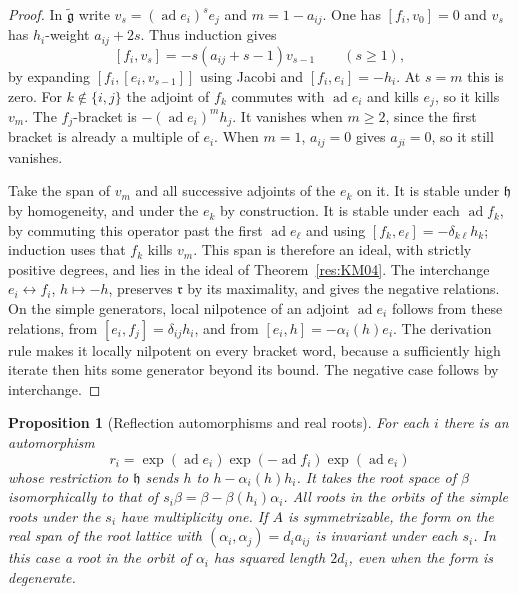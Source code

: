 \documentclass[11pt,oneside,openany]{book}
\newtheorem{proposition}[theorem]{Proposition}
\theoremstyle{definition}
\theoremstyle{remark}
\begin{document}
\begin{proof}
In \(\widetilde{\mathfrak g}\) write
\(v_s=(\operatorname{ad}e_i)^s e_j\) and \(m=1-a_{ij}\).
One has \([f_i,v_0]=0\) and \(v_s\) has \(h_i\)-weight
\(a_{ij}+2s\). Thus induction gives
\[
 [f_i,v_s]=-s(a_{ij}+s-1)v_{s-1}\qquad(s\ge1),
\]
by expanding \([f_i,[e_i,v_{s-1}]]\) using Jacobi and
\([f_i,e_i]=-h_i\). At \(s=m\) this is zero.
For \(k\notin\{i,j\}\) the adjoint of \(f_k\) commutes with
\(\operatorname{ad}e_i\) and kills \(e_j\), so it kills \(v_m\).
The \(f_j\)-bracket is \(-(\operatorname{ad}e_i)^m h_j\).
It vanishes when \(m\ge2\), since the first bracket is already a
multiple of \(e_i\). When \(m=1\), \(a_{ij}=0\) gives
\(a_{ji}=0\), so it still vanishes.

Take the span of \(v_m\) and all successive adjoints of the
\(e_k\) on it. It is stable under \(\mathfrak h\) by homogeneity,
and under the \(e_k\) by construction. It is stable under each
\(\operatorname{ad}f_k\), by commuting this operator past the
first \(\operatorname{ad}e_\ell\) and using
\([f_k,e_\ell]=-\delta_{k\ell}h_k\); induction uses that \(f_k\)
kills \(v_m\). This span is therefore an ideal, with strictly
positive degrees, and lies in the ideal of
Theorem~\ref{res:KM04}. The interchange \(e_i\leftrightarrow f_i\),
\(h\mapsto-h\), preserves \(\mathfrak r\) by its maximality, and
gives the negative relations. On the simple generators, local
nilpotence of an adjoint \(\operatorname{ad}e_i\) follows from
these relations, from \([e_i,f_j]=\delta_{ij}h_i\), and from
\([e_i,h]=-\alpha_i(h)e_i\). The derivation rule makes it
locally nilpotent on every bracket word, because a sufficiently
high iterate then hits some generator beyond its bound.
The negative case follows by interchange.
\end{proof}

\begin{proposition}[Reflection automorphisms and real roots]
\label{res:KM06}
For each \(i\) there is an automorphism
\[
 r_i=\exp(\operatorname{ad}e_i)
      \exp(-\operatorname{ad}f_i)\exp(\operatorname{ad}e_i)
\]
whose restriction to \(\mathfrak h\) sends
\(h\) to \(h-\alpha_i(h)h_i\).
It takes the root space of \(\beta\) isomorphically to that
of \(s_i\beta=\beta-\beta(h_i)\alpha_i\). All roots in the
orbits of the simple roots under the \(s_i\) have multiplicity one.
If \(A\) is symmetrizable, the form on the real span of the
root lattice with
\((\alpha_i,\alpha_j)=d_i a_{ij}\) is invariant under each
\(s_i\). In this case a root in the orbit of \(\alpha_i\)
has squared length \(2d_i\), even when the form is degenerate.
\end{proposition}
\end{document}
